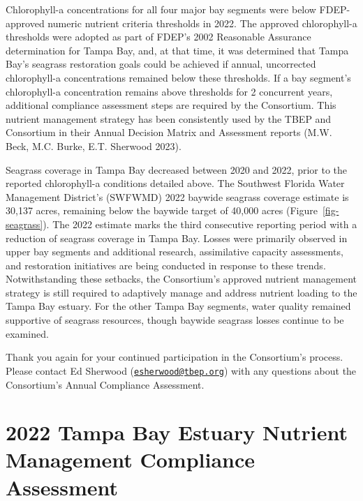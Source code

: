 \documentclass[
  letterpaper,
  DIV=11,
  numbers=noendperiod]{scrreprt}
\begin{document}
Chlorophyll-a concentrations for all four major bay segments were below
FDEP-approved numeric nutrient criteria thresholds in 2022. The approved
chlorophyll-a thresholds were adopted as part of FDEP's 2002 Reasonable
Assurance determination for Tampa Bay, and, at that time, it was
determined that Tampa Bay's seagrass restoration goals could be achieved
if annual, uncorrected chlorophyll-a concentrations remained below these
thresholds. If a bay segment's chlorophyll-a concentration remains above
thresholds for 2 concurrent years, additional compliance assessment
steps are required by the Consortium. This nutrient management strategy
has been consistently used by the TBEP and Consortium in their Annual
Decision Matrix and Assessment reports (M.W. Beck, M.C. Burke, E.T.
Sherwood 2023).

Seagrass coverage in Tampa Bay decreased between 2020 and 2022, prior to
the reported chlorophyll-a conditions detailed above. The Southwest
Florida Water Management District's (SWFWMD) 2022 baywide seagrass
coverage estimate is 30,137 acres, remaining below the baywide target of
40,000 acres (Figure~\ref{fig-seagrass}). The 2022 estimate marks the
third consecutive reporting period with a reduction of seagrass coverage
in Tampa Bay. Losses were primarily observed in upper bay segments and
additional research, assimilative capacity assessments, and restoration
initiatives are being conducted in response to these trends.
Notwithstanding these setbacks, the Consortium's approved nutrient
management strategy is still required to adaptively manage and address
nutrient loading to the Tampa Bay estuary. For the other Tampa Bay
segments, water quality remained supportive of seagrass resources,
though baywide seagrass losses continue to be examined.

Thank you again for your continued participation in the Consortium's
process. Please contact Ed Sherwood
(\href{mailto:esherwood@tbep.org}{\nolinkurl{esherwood@tbep.org}}) with
any questions about the Consortium's Annual Compliance Assessment.


\hypertarget{var-maxyr-tampa-bay-estuary-nutrient-management-compliance-assessment}{%
\chapter{2022 Tampa Bay Estuary Nutrient Management Compliance
Assessment}\label{var-maxyr-tampa-bay-estuary-nutrient-management-compliance-assessment}}
\end{document}
